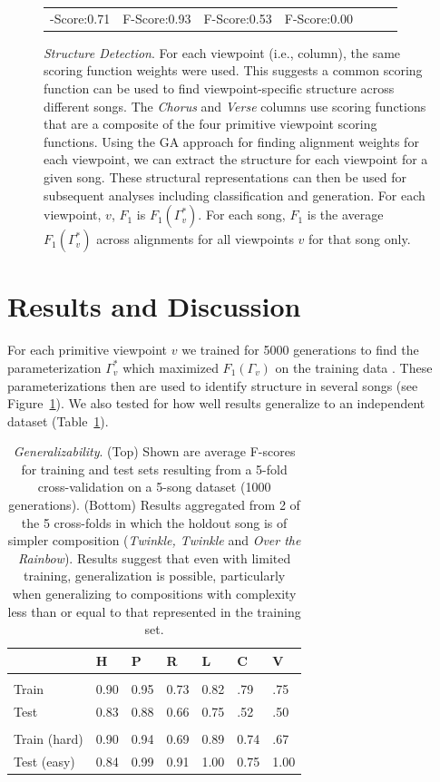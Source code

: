 \documentclass[phd,electronic,oneside,twosidetoc,letterpaper,chaptercenter,parttop,lol,lof,lot]{byumsphd}
\begin{document}
\begin{figure}[t!]
\begin{tabular}{CDDDDDD}
-Score:0.71 & F-Score:0.93 & F-Score:0.53 & F-Score:0.00 \\
\end{tabular}
\caption{\label{fig:song_v_viewpoint}\textit{Structure Detection}. For each viewpoint (i.e., column), the same scoring function weights were used. This suggests a common scoring function can be used to find viewpoint-specific structure across different songs. The \textit{Chorus} and \textit{Verse} columns use scoring functions that are a composite of the four primitive viewpoint scoring functions. Using the GA approach for finding alignment weights for each viewpoint, we can extract the structure for each viewpoint for a given song. These structural representations can then be used for subsequent analyses including classification and generation. For each viewpoint, $v$, $F_{1}$ is $F_{1}(\Gamma^*_v)$. For each song, $F_{1}$ is the average $F_{1}(\Gamma^*_v)$ across alignments for all viewpoints $v$ for that song only.}
\end{figure}

\section{Results and Discussion}

For each primitive viewpoint $v$ we trained for 5000 generations to find the parameterization $\Gamma^*_v$ which maximized $F_1(\Gamma_v)$ on the training data%
. These parameterizations then are used to identify structure in several songs (see Figure~\ref{fig:song_v_viewpoint}). We also tested for how well results generalize to an independent dataset (Table~\ref{tab:generalization}).

\begin{table}
\centering
\begin{tabular}{lllllll}
                     & H & P & R & L & C & V \\
\hline \\ [-1.5ex]
Train & 0.90    & 0.95  & 0.73   & 0.82  & .79  & .75     \\
Test     & 0.83    & 0.88  & 0.66   & 0.75  & .52      & .50  \\ 
\hline \\ [-1.5ex]
Train (hard) & 0.90    & 0.94  & 0.69   & 0.89  & 0.74   & .67   \\
Test (easy)     & 0.84    & 0.99  & 0.91   & 1.00  & 0.75   & 1.00 \\
\hline
\end{tabular}
\caption{\textit{Generalizability}. (Top) Shown are average F-scores for training and test sets resulting from a 5-fold cross-validation on a 5-song dataset (1000 generations). (Bottom) Results aggregated from 2 of the 5 cross-folds in which the holdout song is of simpler composition (\textit{Twinkle, Twinkle} and \textit{Over the Rainbow}). Results suggest that even with limited training, generalization is possible, particularly when generalizing to compositions with complexity less than or equal to that represented in the training set.}
\label{tab:generalization}
\end{table}
\end{document}
